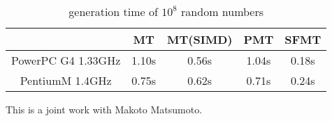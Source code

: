 \documentclass{article}
\begin{document}
\vspace*{-.5\baselineskip}
\begin{table}[hb]
\begin{center}
\caption{generation time of $10^8$ random numbers\label{speed}}
\begin{tabular}{|c|c|c|c|c|} \hline
& MT & MT(SIMD) & PMT & SFMT \\ \hline
PowerPC G4 1.33GHz & 1.10s & 0.56s & 1.04s & 0.18s \\ \hline
PentiumM 1.4GHz & 0.75s & 0.62s & 0.71s & 0.24s \\ \hline
\end{tabular}
\end{center}
\end{table}
\vspace*{-.5\baselineskip}
This is a joint work with Makoto Matsumoto.
\end{document}
